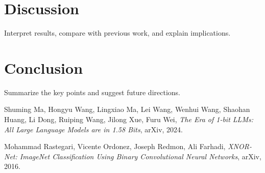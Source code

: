 \documentclass{article}
\begin{document}
\section{Discussion}
Interpret results, compare with previous work, and explain implications.

\section{Conclusion}
Summarize the key points and suggest future directions.

\begin{thebibliography}{9}

Shuming Ma, Hongyu Wang, Lingxiao Ma, Lei Wang, Wenhui Wang, Shaohan Huang, Li Dong, Ruiping Wang, Jilong Xue, Furu Wei, \textit{The Era of 1-bit LLMs: All Large Language Models are in 1.58 Bits}, arXiv, 2024.

Mohammad Rastegari, Vicente Ordonez, Joseph Redmon, Ali Farhadi, \textit{XNOR-Net: ImageNet Classification Using Binary Convolutional Neural Networks}, arXiv, 2016.

\end{thebibliography}
\end{document}
